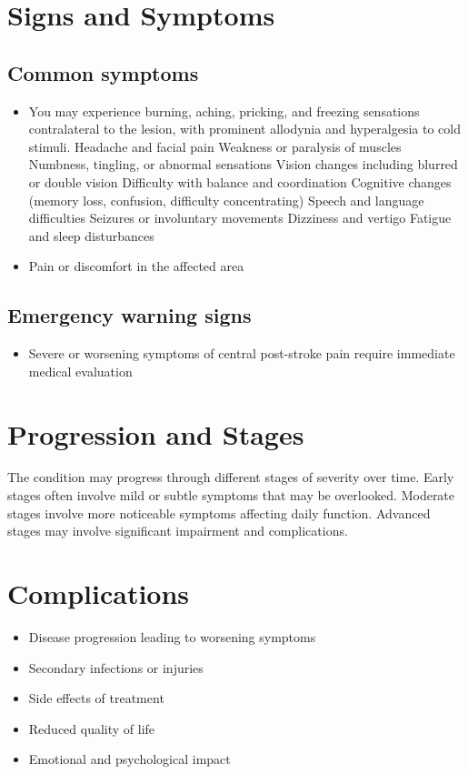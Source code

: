 \section{Signs and Symptoms}
\subsection{Common symptoms}
\begin{itemize}[noitemsep]
  \item You may experience burning, aching, pricking, and freezing sensations contralateral to the lesion, with prominent allodynia and hyperalgesia to cold stimuli. Headache and facial pain Weakness or paralysis of muscles Numbness, tingling, or abnormal sensations Vision changes including blurred or double vision Difficulty with balance and coordination Cognitive changes (memory loss, confusion, difficulty concentrating) Speech and language difficulties Seizures or involuntary movements Dizziness and vertigo Fatigue and sleep disturbances
  \item Pain or discomfort in the affected area
  \end{itemize}
\subsection{Emergency warning signs}
\begin{itemize}[noitemsep]
  \item Severe or worsening symptoms of central post-stroke pain require immediate medical evaluation
\end{itemize}
\section{Progression and Stages}
The condition may progress through different stages of severity over time. Early stages often involve mild or subtle symptoms that may be overlooked. Moderate stages involve more noticeable symptoms affecting daily function. Advanced stages may involve significant impairment and complications.
\section{Complications}
\begin{itemize}[noitemsep]
  \item Disease progression leading to worsening symptoms
  \item Secondary infections or injuries
  \item Side effects of treatment
  \item Reduced quality of life
  \item Emotional and psychological impact
\end{itemize}
